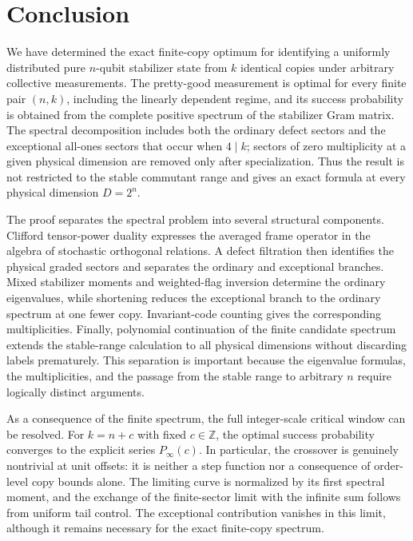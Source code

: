 \documentclass[journal,twocolumn]{IEEEtran}
\theoremstyle{definition}
\theoremstyle{plain}
\begin{document}

\section{Conclusion}
\label{sec:conclusion}

We have determined the exact finite-copy optimum for identifying a uniformly distributed pure $n$-qubit stabilizer state from $k$ identical copies under arbitrary collective measurements.  The pretty-good measurement is optimal for every finite pair $(n,k)$, including the linearly dependent regime, and its success probability is obtained from the complete positive spectrum of the stabilizer Gram matrix.  The spectral decomposition includes both the ordinary defect sectors and the exceptional all-ones sectors that occur when $4\mid k$; sectors of zero multiplicity at a given physical dimension are removed only after specialization.  Thus the result is not restricted to the stable commutant range and gives an exact formula at every physical dimension $D=2^n$.

The proof separates the spectral problem into several structural components.  Clifford tensor-power duality expresses the averaged frame operator in the algebra of stochastic orthogonal relations.  A defect filtration then identifies the physical graded sectors and separates the ordinary and exceptional branches.  Mixed stabilizer moments and weighted-flag inversion determine the ordinary eigenvalues, while shortening reduces the exceptional branch to the ordinary spectrum at one fewer copy.  Invariant-code counting gives the corresponding multiplicities.  Finally, polynomial continuation of the finite candidate spectrum extends the stable-range calculation to all physical dimensions without discarding labels prematurely.  This separation is important because the eigenvalue formulas, the multiplicities, and the passage from the stable range to arbitrary $n$ require logically distinct arguments.

As a consequence of the finite spectrum, the full integer-scale critical window can be resolved.  For $k=n+c$ with fixed $c\in\mathbb Z$, the optimal success probability converges to the explicit series $P_\infty(c)$.  In particular, the crossover is genuinely nontrivial at unit offsets: it is neither a step function nor a consequence of order-level copy bounds alone.  The limiting curve is normalized by its first spectral moment, and the exchange of the finite-sector limit with the infinite sum follows from uniform tail control.  The exceptional contribution vanishes in this limit, although it remains necessary for the exact finite-copy spectrum.
\end{document}
